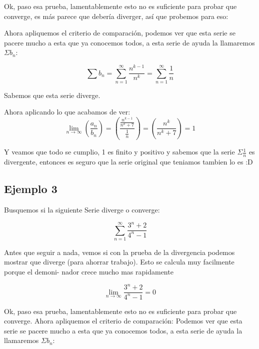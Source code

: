 \documentclass[12pt]{report}							    %
\begin{document}
    Ok, paso esa prueba, lamentablemente esto no es suficiente para probar que converge, es más parece que debería diverger, así que probemos para eso:

    Ahora apliquemos el criterio de comparación, podemos ver que esta serie se pacere mucho a esta que ya conocemos todos, a esta serie de ayuda la llamaremos $\Sigma b_n$:

    \begin{equation*}
        \sum b_n = \sum_{n=1}^{\infty} \frac{n^{k-1}}{n^k} = \sum_{n=1}^{\infty} \frac{1}{n}
    \end{equation*}

    Sabemos que esta serie diverge.

    Ahora aplicando lo que acabamos de ver:
    \begin{equation*}
        \lim_{n \to \infty} \left( \frac{a_n}{b_n} \right) = \left( \frac{ \frac{n^{k-1}}{n^k+7} }{ \frac{1}{n} } \right) =  \left( \frac{n^k}{n^k+7} \right) = 1
    \end{equation*}

    Y veamos que todo se cumplio, 1 es finito y positivo y sabemos que la serie $\Sigma \frac{1}{n}$ es divergente, entonces es seguro que la serie original que teniamos tambien lo es :D


    \subsection{Ejemplo 3}
    Busquemos si la siguiente Serie diverge o converge:

    \begin{equation*}
        \sum_{n=1}^{\infty} \frac{3^n+2}{4^n-1}
    \end{equation*}

    Antes que seguir a nada, vemos si con la prueba de la divergencia podemos mostrar que diverge (para ahorrar trabajo). Esto se calcula muy facilmente porque el demoni- nador crece mucho mas rapidamente

    \begin{equation*}
        \lim_{n \to \infty}  \frac{3^n+2}{4^n-1} = 0
    \end{equation*}


    Ok, paso esa prueba, lamentablemente esto no es
    suficiente para probar que converge.
    Ahora apliquemos el criterio de comparación: Podemos ver que esta serie se pacere mucho a esta que ya conocemos todos, a esta serie de ayuda la llamaremos $\Sigma b_n$:
\end{document}
